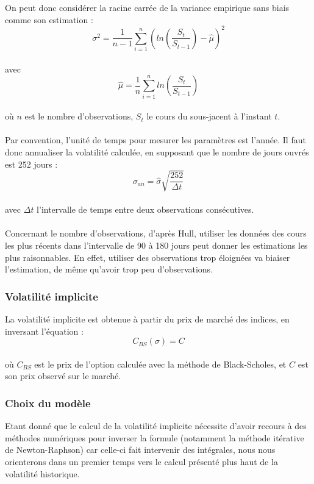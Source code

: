 \documentclass[french,12pt,a4paper]{article}
\begin{document}
On peut donc considérer la racine carrée de la variance empirique sans biais comme son estimation :\\
$$ \widehat{\sigma^{2}} = \frac{1}{n-1} \sum_{i=1}^n (ln(\frac{S_{t}}{S_{t-1}}) - \widehat{\mu})^{2}	$$ \\
avec \\
$$ \widehat{\mu} = \frac{1}{n} \sum_{i=1}^n ln(\frac{S_{t}}{S_{t-1}})  $$ \\
où $n$ est le nombre d'observations, $S_{t}$ le cours du sous-jacent à l'instant $t$. \\ \\
Par convention, l'unité de temps pour mesurer les paramètres est l'année. Il faut donc annualiser la volatilité calculée, en supposant que le nombre de jours ouvrés est 252 jours : \\
$$ \sigma_{an} = \widehat{\sigma} \sqrt{\frac{252}{\Delta t}}  $$ \\
avec $\Delta t $ l'intervalle de temps entre deux observations consécutives.\\ \\
Concernant le nombre d'observations, d'après Hull, utiliser les données des cours les plus récents dans l'intervalle de 90 à 180 jours peut donner les estimations les plus raisonnables. En effet, utiliser des observations trop éloignées va biaiser l'estimation, de même qu'avoir trop peu d'observations.\\

\subsubsection{Volatilité implicite}
La volatilité implicite est obtenue à partir du prix de marché des indices, en inversant l'équation :
$$ C_{BS}(\sigma) = C $$ \\
où $C_{BS}$ est le prix de l'option calculée avec la méthode de Black-Scholes, et $C$ est son prix observé sur le marché.\\

\subsubsection{Choix du modèle}
Etant donné que le calcul de la volatilité implicite nécessite d'avoir recours à des méthodes numériques pour inverser la formule (notamment la méthode itérative de Newton-Raphson) car celle-ci fait intervenir des intégrales, nous nous orienterons dans un premier temps vers le calcul présenté plus haut de la volatilité historique.
\end{document}
